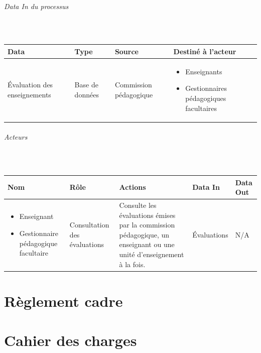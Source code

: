 \documentclass[a4paper,11pt]{report}
\begin{document}
\paragraph{Data In du processus}~\newline{}

\begin{tabularx}{\linewidth}{|X|X|X|X|} \hline
Data & Type & Source & Destiné à l'acteur \\ \hline
Évaluation des enseignements & Base de données & Commission pédagogique &
\begin{itemize}
	\item Enseignants
	\item Gestionnaires pédagogiques facultaires\newline{}
\end{itemize}
\\ \hline
\end{tabularx}



\paragraph{Acteurs}~\newline{}

\begin{tabularx}{\linewidth}{|X|X|X|X|X|} \hline
Nom & Rôle & Actions & Data In & Data Out \\ \hline 
\begin{itemize}
	\item Enseignant
	\item Gestionnaire pédagogique facultaire
\end{itemize}
& Consultation des évaluations & Consulte les évaluations émises par la commission pédagogique, un enseignant ou une unité d'enseignement à la fois. & Évaluations & N/A \\ \hline
\end{tabularx}




\appendix
\renewcommand{\partname}{Annexe}
\setcounter{part}{0}%
\part{Règlement cadre}\label{an:regl-cadre}


\part{Cahier des charges}

\end{document}
